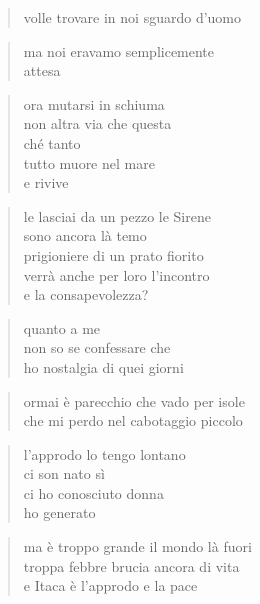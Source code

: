 	\begin{verse}
		volle trovare in noi sguardo d’uomo
	\end{verse}

	\begin{verse}
		ma noi eravamo semplicemente\\
		attesa
	\end{verse}

	\begin{verse}
		ora mutarsi in schiuma\\
		non altra via che questa\\
		ché tanto\\
		tutto muore nel mare\\
		e rivive
	\end{verse}

\clearpage



	\begin{verse}
		le lasciai da un pezzo le Sirene\\
		sono ancora là temo\\
		prigioniere di un prato fiorito\\
		verrà anche per loro l’incontro\\
		e la consapevolezza?
	\end{verse}

	\begin{verse}
		quanto a me\\
		non so se confessare che\\
		ho nostalgia di quei giorni
	\end{verse}

	\begin{verse}
		ormai è parecchio che vado per isole\\
		che mi perdo nel cabotaggio piccolo
	\end{verse}

	\begin{verse}
		l’approdo lo tengo lontano\\
		ci son nato sì\\
		ci ho conosciuto donna\\
		ho generato
	\end{verse}

	\begin{verse}
		ma è troppo grande il mondo là fuori\\
		troppa febbre brucia ancora di vita\\
		e Itaca è l’approdo e la pace
	\end{verse}

